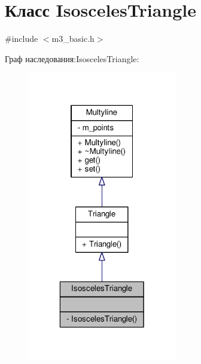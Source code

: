 \hypertarget{class_isosceles_triangle}{\section{Класс Isosceles\-Triangle}
\label{class_isosceles_triangle}
}


{\ttfamily \#include $<$m3\-\_\-basic.\-h$>$}



Граф наследования\-:Isosceles\-Triangle\-:
\nopagebreak
\begin{figure}[H]
\begin{center}
\leavevmode
\includegraphics[width=184pt]{class_isosceles_triangle__inherit__graph}
\end{center}
\end{figure}


